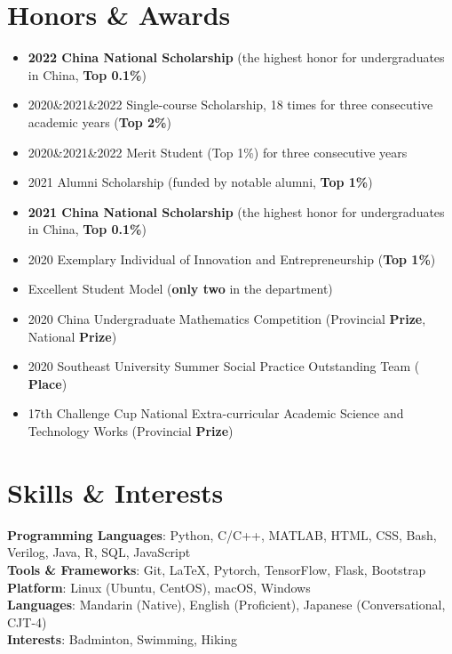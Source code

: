 \documentclass[letterpaper,11pt]{article}
\begin{document}
\section{\textbf{Honors \& Awards}}
\begin{itemize}
    \item {\textbf{2022 China National Scholarship}} (the highest honor for undergraduates in China, \textbf{Top 0.1\%})
    \item 2020\&2021\&2022 Single-course Scholarship, 18 times for three consecutive academic years (\textbf{Top 2\%})
    \item 2020\&2021\&2022 Merit Student (Top 1\%) for three consecutive years
    \item 2021 Alumni Scholarship (funded by notable alumni, \textbf{Top 1\%})
    \item {\textbf{2021 China National Scholarship}} (the highest honor for undergraduates in China, \textbf{Top 0.1\%})
    \item 2020 Exemplary Individual of Innovation and Entrepreneurship (\textbf{Top 1\%})
    \item Excellent Student Model (\textbf{only two} in the department)
    \item 2020 China Undergraduate Mathematics Competition (Provincial \textbf{ Prize}, National \textbf{ Prize})
    \item 2020 Southeast University Summer Social Practice Outstanding Team (\textbf{ Place})
    \item 17th Challenge Cup National Extra-curricular Academic Science and Technology Works (Provincial \textbf{ Prize})
\end{itemize}
\vspace{-9pt}

\section{\textbf{Skills \& Interests}}
\textbf{Programming Languages}{: Python, C/C++, MATLAB, HTML, CSS, Bash, Verilog, Java, R, SQL, JavaScript} \\
\textbf{Tools \& Frameworks}{: Git, LaTeX, Pytorch, TensorFlow, Flask, Bootstrap} \\
\textbf{Platform}: Linux (Ubuntu, CentOS), macOS, Windows \\
\textbf{Languages}: Mandarin (Native), English (Proficient), Japanese (Conversational, CJT-4) \\
\textbf{Interests}{: Badminton, Swimming, Hiking}
\vspace{-160pt}
\end{document}
